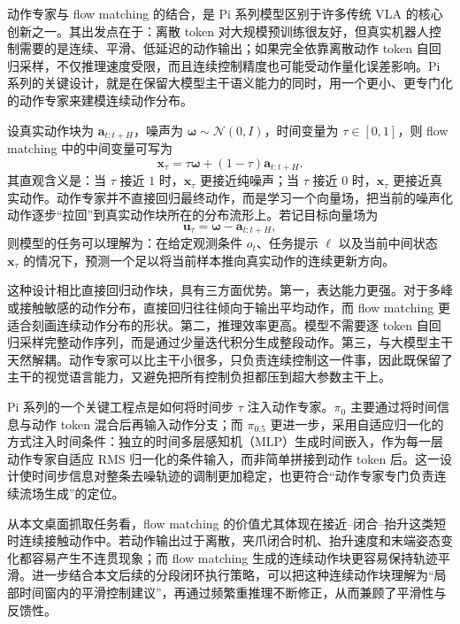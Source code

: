 动作专家与 flow matching 的结合，是 Pi 系列模型区别于许多传统 VLA 的核心创新之一。其出发点在于：离散 token 对大规模预训练很友好，但真实机器人控制需要的是连续、平滑、低延迟的动作输出；如果完全依靠离散动作 token 自回归采样，不仅推理速度受限，而且连续控制精度也可能受动作量化误差影响。Pi 系列的关键设计，就是在保留大模型主干语义能力的同时，用一个更小、更专门化的动作专家来建模连续动作分布\cite{black2024pi0,black2025pi05}。

设真实动作块为 $\mathbf{a}_{t:t+H}$，噪声为 $\boldsymbol{\omega}\sim\mathcal{N}(0,I)$，时间变量为 $\tau\in[0,1]$，则 flow matching 中的中间变量可写为
\begin{equation}
  \mathbf{x}_{\tau}
  =
  \tau\boldsymbol{\omega} + (1-\tau)\mathbf{a}_{t:t+H}.
  \label{eq:flow-interp}
\end{equation}
其直观含义是：当 $\tau$ 接近 $1$ 时，$\mathbf{x}_{\tau}$ 更接近纯噪声；当 $\tau$ 接近 $0$ 时，$\mathbf{x}_{\tau}$ 更接近真实动作。动作专家并不直接回归最终动作，而是学习一个向量场，把当前的噪声化动作逐步“拉回”到真实动作块所在的分布流形上。若记目标向量场为
\begin{equation}
  \mathbf{u}_{\tau}
  =
  \boldsymbol{\omega}-\mathbf{a}_{t:t+H},
  \label{eq:flow-vector}
\end{equation}
则模型的任务可以理解为：在给定观测条件 $o_t$、任务提示 $\ell$ 以及当前中间状态 $\mathbf{x}_{\tau}$ 的情况下，预测一个足以将当前样本推向真实动作的连续更新方向。

这种设计相比直接回归动作块，具有三方面优势。第一，表达能力更强。对于多峰或接触敏感的动作分布，直接回归往往倾向于输出平均动作，而 flow matching 更适合刻画连续动作分布的形状。第二，推理效率更高。模型不需要逐 token 自回归采样完整动作序列，而是通过少量迭代积分生成整段动作。第三，与大模型主干天然解耦。动作专家可以比主干小很多，只负责连续控制这一件事，因此既保留了主干的视觉语言能力，又避免把所有控制负担都压到超大参数主干上。

Pi 系列的一个关键工程点是如何将时间步 $\tau$ 注入动作专家。$\pi_{0}$ 主要通过将时间信息与动作 token 混合后再输入动作分支；而 $\pi_{0.5}$ 更进一步，采用自适应归一化的方式注入时间条件：独立的时间多层感知机（MLP）生成时间嵌入，作为每一层动作专家自适应 RMS 归一化的条件输入，而非简单拼接到动作 token 后。这一设计使时间步信息对整条去噪轨迹的调制更加稳定，也更符合“动作专家专门负责连续流场生成”的定位。

从本文桌面抓取任务看，flow matching 的价值尤其体现在接近--闭合--抬升这类短时连续接触动作中。若动作输出过于离散，夹爪闭合时机、抬升速度和末端姿态变化都容易产生不连贯现象；而 flow matching 生成的连续动作块更容易保持轨迹平滑。进一步结合本文后续的分段闭环执行策略，可以把这种连续动作块理解为“局部时间窗内的平滑控制建议”，再通过频繁重推理不断修正，从而兼顾了平滑性与反馈性。


